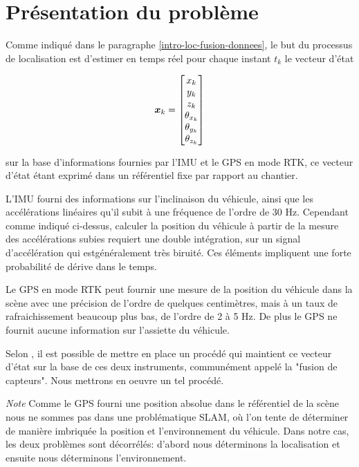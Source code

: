 \documentclass[12pt,a4paper]{report}
\begin{document}
	\section{Présentation du problème}
	Comme indiqué dans le paragraphe \ref{intro-loc-fusion-donnees}, le but du processus de localisation est d'estimer en temps réel pour chaque instant $t_k$ le vecteur d'état 
	
	\begin{equation}	
	\boldsymbol{x}_k = \begin{bmatrix}
	x_k \\ y_k \\ z_k \\ \theta_{x_k} \\ \theta_{y_k} \\ \theta_{z_k}
	\end{bmatrix}
	\end{equation}
	\newline
	
	sur la base d'informations fournies par l'IMU et le GPS en mode RTK, ce vecteur d'état étant exprimé dans un référentiel fixe par rapport au chantier.
	
	\para L'IMU fourni des informations sur l'inclinaison du véhicule, ainsi que les accélérations linéaires qu'il subit à une fréquence de l'ordre de 30 Hz. Cependant comme indiqué ci-dessus, calculer la position du véhicule à partir de la mesure des accélérations subies requiert une double intégration, sur un signal d'accélération qui estgénéralement très biruité. Ces éléments impliquent une forte probabilité de dérive dans le temps.
	
	\para Le GPS en mode RTK peut fournir une mesure de la position du véhicule dans la scène avec une précision de l'ordre de quelques centimètres, mais à un taux de rafraichissement beaucoup plus bas, de l'ordre de 2 à 5 Hz. De plus le GPS ne fournit aucune information sur l'assiette du véhicule.
	
	
	
	\para Selon \cite{gustavsson_uav_2015}, il est possible de mettre en place un procédé qui maintient ce vecteur d'état sur la base de ces deux instruments, communément appelé la "fusion de capteurs". Nous mettrons en oeuvre un tel procédé.
	
	\textit{Note} Comme le GPS fourni une position absolue dans le référentiel de la scène nous ne sommes pas dans une problématique SLAM, où l'on tente de déterminer de manière imbriquée la position et l'environnement du véhicule. Dans notre cas, les deux problèmes sont décorrélés: d'abord nous déterminons la localisation et ensuite nous déterminons l'environnement. 
	
\end{document}
